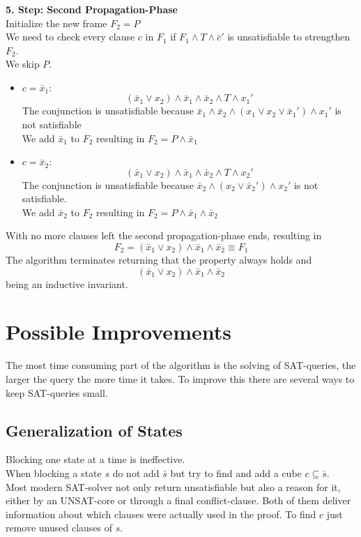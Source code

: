 \documentclass[11pt, a4paper, BCOR=10mm, ngerman]{scrbook}
\begin{document}
\textbf{5. Step: Second Propagation-Phase} \\
Initialize the new frame $F_2 = P$ \\
We need to check every clause $c$ in $F_1$ if $F_1 \land T \land \bar c'$ is unsatisfiable to strengthen $F_2$.\\ We  skip $P$. 
\begin{itemize}
\item $c = \bar x_1:$
\begin{equation*}
(\bar x_1 \lor x_2) \land \bar x_1 \land \bar x_2 \land T \land x_1'
\end{equation*}
The conjunction is unsatisfiable because $\bar x_1 \land \bar x_2 \land (x_1 \lor x_2 \lor \bar x_1') \land x_1'$ is not satisfiable \\
We add $\bar x_1$ to $F_2$ resulting in
$F_2 = P \land \bar x_1$ \\

\item $c = \bar x_2:$ 
\begin{equation*}
(\bar x_1 \lor x_2) \land \bar x_1 \land \bar x_2 \land T \land x_2'
\end{equation*}
The conjunction is unsatisfiable because $\bar x_2 \land (x_2 \lor \bar x_2') \land x_2'$ is not satisfiable. \\
We add $\bar x_2$ to $F_2$ resulting in
$F_2 = P \land \bar x_1 \land \bar x_2$

\end{itemize}

With no more clauses left the second propagation-phase ends, resulting in 
\begin{equation*}
F_2 = (\bar x_1 \lor x_2) \land \bar x_1 \land \bar x_2 \equiv F_1
\end{equation*}
The algorithm terminates returning that the property always holds and
\begin{equation*}
(\bar x_1 \lor x_2) \land \bar x_1 \land \bar x_2
\end{equation*}
 being an inductive invariant.

\section{Possible Improvements}
The most time consuming part of the algorithm is the solving of SAT-queries, the larger the query the more time it takes. To improve this there are several ways to keep SAT-queries small.

\subsection{Generalization of States}
Blocking one state at a time is ineffective.  \\
When blocking a state $s$ do not add $\bar s$ but try to find and add a cube $c \subseteq \bar s$. \\
Most modern SAT-solver not only return unsatisfiable but also a reason for it, either by an UNSAT-core or through a final conflict-clause. Both of them deliver information about which clauses were actually used in the proof. To find $c$ just remove unused clauses of $s$.
\end{document}
